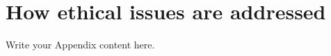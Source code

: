 
\chapter{How ethical issues are addressed} %

\label{AppendixA} %


Write your Appendix content here.